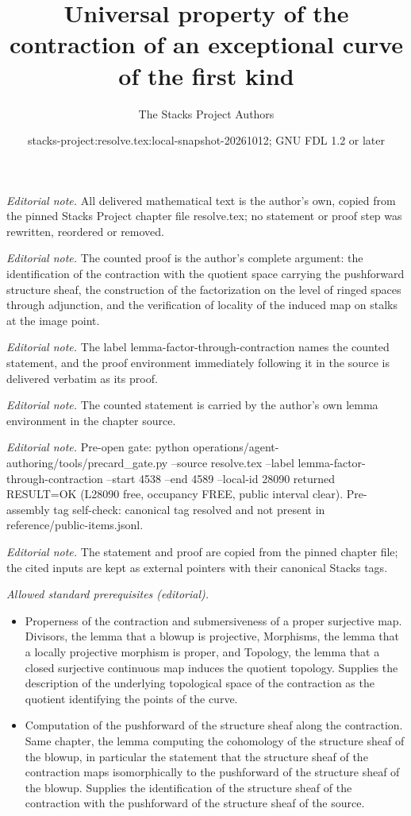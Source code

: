 \documentclass[10pt,a4paper]{amsart}
\title{Universal property of the contraction of an exceptional curve of the first kind}
\author{The Stacks Project Authors}
\date{stacks-project:resolve.tex:local-snapshot-20261012; GNU FDL 1.2 or later}
\theoremstyle{plain}
\theoremstyle{definition}
\theoremstyle{remark}
\numberwithin{equation}{subsection}
\begin{document}
\maketitle
\noindent\textit{Editorial note.} All delivered mathematical text is the author's own, copied from the pinned Stacks Project chapter file resolve.tex; no statement or proof step was rewritten, reordered or removed.\par\medskip
\noindent\textit{Editorial note.} The counted proof is the author's complete argument: the identification of the contraction with the quotient space carrying the pushforward structure sheaf, the construction of the factorization on the level of ringed spaces through adjunction, and the verification of locality of the induced map on stalks at the image point.\par\medskip
\noindent\textit{Editorial note.} The label lemma-factor-through-contraction names the counted statement, and the proof environment immediately following it in the source is delivered verbatim as its proof.\par\medskip
\noindent\textit{Editorial note.} The counted statement is carried by the author's own lemma environment in the chapter source.\par\medskip
\noindent\textit{Editorial note.} Pre-open gate: python operations/agent-authoring/tools/precard\_gate.py --source resolve.tex --label lemma-factor-through-contraction --start 4538 --end 4589 --local-id 28090 returned RESULT=OK (L28090 free, occupancy FREE, public interval clear). Pre-assembly tag self-check: canonical tag resolved and not present in reference/public-items.jsonl.\par\medskip
\noindent\textit{Editorial note.} The statement and proof are copied from the pinned chapter file; the cited inputs are kept as external pointers with their canonical Stacks tags.\par\medskip
\noindent\textit{Allowed standard prerequisites (editorial).}\begin{itemize}
\item Properness of the contraction and submersiveness of a proper surjective map. Divisors, the lemma that a blowup is projective, Morphisms, the lemma that a locally projective morphism is proper, and Topology, the lemma that a closed surjective continuous map induces the quotient topology. Supplies the description of the underlying topological space of the contraction as the quotient identifying the points of the curve.
\item Computation of the pushforward of the structure sheaf along the contraction. Same chapter, the lemma computing the cohomology of the structure sheaf of the blowup, in particular the statement that the structure sheaf of the contraction maps isomorphically to the pushforward of the structure sheaf of the blowup. Supplies the identification of the structure sheaf of the contraction with the pushforward of the structure sheaf of the source.
\end{itemize}\medskip
\end{document}
